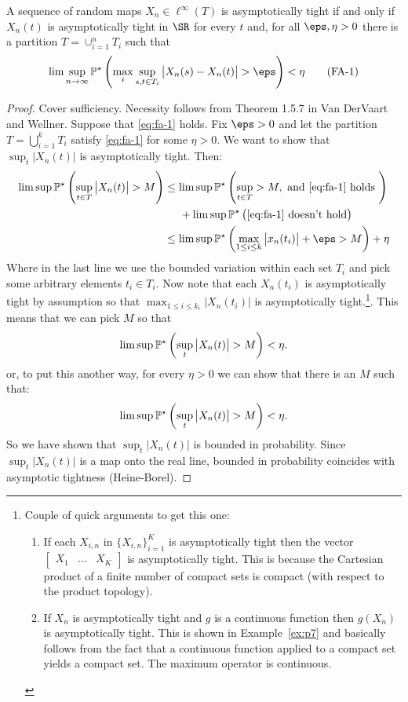 \begin{theorem}
	\label{thm:vdv1.5.6}
	A sequence of random maps \(X_n \in \ell^\infty(T)\) is asymptotically tight if and only if \(X_n(t)\) is asymptotically tight in  \(\SR\) for every  \(t\) and, for all  \(\eps,\eta > 0\) there is a partition  \(T = \cup_{i=1}^n T_i\) such that 
	 \begin{equation}
		\label{eq:fa-1}
		\lim\sup_{n\to\infty}\P^\star\left(\max_i \sup_{s,t\in T_i} \left|X_n(s) -X_n(t)\right|>\eps\right)<\eta\tag{FA-1}
	\end{equation}
\end{theorem}
\begin{proof}
	Cover sufficiency. Necessity follows from Theorem 1.5.7 in Van DerVaart and Wellner.
	Suppose that \eqref{eq:fa-1} holds. Fix \(\eps > 0\) and let the partition \(T = \bigcup_{i=1}^k T_i\) satisfy \eqref{eq:fa-1} for some \(\eta > 0\). We want to show that \(\sup_t \left|X_n(t)\right|\) is asymptotically tight. Then:
	\begin{align*}
		\lim\sup \P^\star\left(\sup_{t\in T}\left|X_n(t)\right|>M\right)
		&\leq \lim\sup \P^\star\left(\sup_{t\in T} > M, \text{ and } \eqref{eq:fa-1}\text{ holds }\right)\\
		&\;\;\;\;\;+ \lim\sup \P^\star\left(\eqref{eq:fa-1}\text{ doesn't hold}\right) \\
		&\leq \lim\sup\P^\star\left(\max_{1\leq i\leq k}\left|x_n(t_i)\right|+\eps > M\right) + \eta
	\end{align*}
	Where in the last line we use the bounded variation within each set \(T_i\) and pick some arbitrary elements  \(t_i \in T_i\). Now note that each  \(X_n(t_i)\) is asymptotically tight by assumption so that  \(\max_{1\leq i\leq k_i}\left|X_n(t_i)\right|\) is asymptotically tight.\footnote{ Couple of quick arguments to get this one:
	\begin{enumerate}
		\item If each \(X_{i,n}\) in \(\{X_{i,n}\}_{i=1}^K\) is asymptotically tight then the vector \(\begin{bmatrix} X_1&\dots&X_K \end{bmatrix} \) is asymptotically tight. This is because the Cartesian product of a finite number of compact sets is compact (with respect to the product topology).
		\item If \(X_n\) is asymptotically tight and \(g\) is a continuous function then  \(g(X_n)\) is asymptotically tight. This is shown in Example~\ref{ex:p7} and basically follows from the fact that a continuous function applied to a compact set yields a compact set. The maximum operator is continuous. 
	\end{enumerate}}.
	This means that we can pick \(M\) so that
	 \[
		 \limsup \P^\star\left(\sup_t \left|X_n(t)\right|>M\right)<\eta
	.\] 
	or, to put this another way, for every \(\eta > 0\) we can show that there is an  \(M\) such that:
	 \[
		 \lim\sup \P^\star\left(\sup_t \left|X_n(t)\right|>M\right)<\eta
	.\]
	So we have shown that \(\sup_t\left|X_n(t)\right|\) is bounded in probability. Since \(\sup_t\left|X_n(t)\right|\) is a map onto the real line, bounded in probability coincides with asymptotic tightness (Heine-Borel).


\end{proof}
